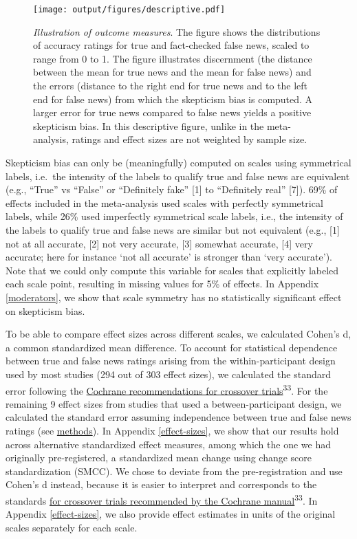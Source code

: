 \documentclass[
  man]{apa6}
\begin{document}
\begin{figure}
\centering
\texttt{[image: output/figures/descriptive.pdf]}
\caption{\label{fig:descriptive}\emph{Illustration of outcome measures}. The figure shows the distributions of accuracy ratings for true and fact-checked false news, scaled to range from 0 to 1. The figure illustrates discernment (the distance between the mean for true news and the mean for false news) and the errors (distance to the right end for true news and to the left end for false news) from which the skepticism bias is computed. A larger error for true news compared to false news yields a positive skepticism bias. In this descriptive figure, unlike in the meta-analysis, ratings and effect sizes are not weighted by sample size.}
\end{figure}

Skepticism bias can only be (meaningfully) computed on scales using symmetrical labels, i.e.~the intensity of the labels to qualify true and false news are equivalent (e.g., ``True'' vs ``False'' or ``Definitely fake'' {[}1{]} to ``Definitely real'' {[}7{]}). 69\% of effects included in the meta-analysis used scales with perfectly symmetrical labels, while 26\% used imperfectly symmetrical scale labels, i.e., the intensity of the labels to qualify true and false news are similar but not equivalent (e.g., {[}1{]} not at all accurate, {[}2{]} not very accurate, {[}3{]} somewhat accurate, {[}4{]} very accurate; here for instance `not all accurate' is stronger than `very accurate'). Note that we could only compute this variable for scales that explicitly labeled each scale point, resulting in missing values for 5\% of effects. In Appendix \ref{moderators}, we show that scale symmetry has no statistically significant effect on skepticism bias.

To be able to compare effect sizes across different scales, we calculated Cohen's d, a common standardized mean difference. To account for statistical dependence between true and false news ratings arising from the within-participant design used by most studies (294 out of 303 effect sizes), we calculated the standard error following the \href{https://training.cochrane.org/handbook/current/chapter-23\#section-23-2-7-3}{Cochrane recommendations for crossover trials}\textsuperscript{33}. For the remaining 9 effect sizes from studies that used a between-participant design, we calculated the standard error assuming independence between true and false news ratings (see \hyperref[methods]{methods}). In Appendix \ref{effect-sizes}, we show that our results hold across alternative standardized effect measures, among which the one we had originally pre-registered, a standardized mean change using change score standardization (SMCC). We chose to deviate from the pre-registration and use Cohen's d instead, because it is easier to interpret and corresponds to the standards \href{https://training.cochrane.org/handbook/current/chapter-23\#section-23-2-7-3}{for crossover trials recommended by the Cochrane manual}\textsuperscript{33}. In Appendix \ref{effect-sizes}, we also provide effect estimates in units of the original scales separately for each scale.
\end{document}
